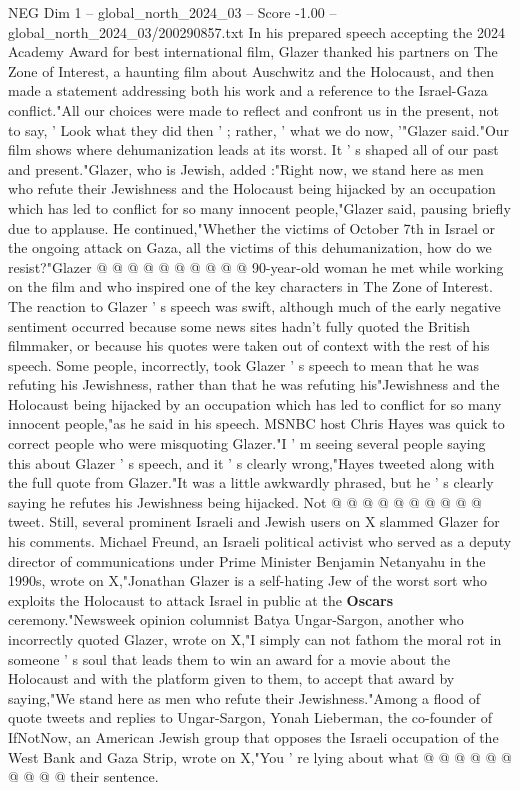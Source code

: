 \begin{textsample}{NEG Dim 1 – global\_north\_2024\_03 – Score -1.00 – global\_north\_2024\_03/200290857.txt}  \label{ex:f1_neg_073}
In his prepared speech accepting the 2024 Academy Award for best international film, Glazer thanked his partners on The Zone of Interest, a haunting film about Auschwitz and the Holocaust, and then made a statement addressing both his work and a reference to the Israel-Gaza conflict."All our choices were made to reflect and confront us in the present, not to say, ' Look what they did then ' ; rather, ' what we do now, '"Glazer said."Our film shows where dehumanization leads at its worst.
It ' s shaped all of our past and present."Glazer, who is Jewish, added :"Right now, we stand here as men who refute their Jewishness and the Holocaust being hijacked by an occupation which has led to conflict for so many innocent people,"Glazer said, pausing briefly due to applause.
He continued,"Whether the victims of October 7th in Israel or the ongoing attack on Gaza, all the victims of this dehumanization, how do we resist?"Glazer @ @ @ @ @ @ @ @ @ @ 90-year-old woman he met while working on the film and who inspired one of the key characters in The Zone of Interest.
The reaction to Glazer ' s speech was swift, although much of the early negative sentiment occurred because some news sites hadn't fully quoted the British filmmaker, or because his quotes were taken out of context with the rest of his speech.
Some people, incorrectly, took Glazer ' s speech to mean that he was refuting his Jewishness, rather than that he was refuting his"Jewishness and the Holocaust being hijacked by an occupation which has led to conflict for so many innocent people,"as he said in his speech.
MSNBC host Chris Hayes was quick to correct people who were misquoting Glazer."I ' m seeing several people saying this about Glazer ' s speech, and it ' s clearly wrong,"Hayes tweeted along with the full quote from Glazer."It was a little awkwardly phrased, but he ' s clearly saying he refutes his Jewishness being hijacked.
Not @ @ @ @ @ @ @ @ @ @ tweet.
Still, several prominent Israeli and Jewish users on X slammed Glazer for his comments.
Michael Freund, an Israeli political activist who served as a deputy director of communications under Prime Minister Benjamin Netanyahu in the 1990s, wrote on X,"Jonathan Glazer is a self-hating Jew of the worst sort who exploits the Holocaust to attack Israel in public at the \textbf{Oscars} ceremony."Newsweek opinion columnist Batya Ungar-Sargon, another who incorrectly quoted Glazer, wrote on X,"I simply can not fathom the moral rot in someone ' s soul that leads them to win an award for a movie about the Holocaust and with the platform given to them, to accept that award by saying,"We stand here as men who refute their Jewishness."Among a flood of quote tweets and replies to Ungar-Sargon, Yonah Lieberman, the co-founder of IfNotNow, an American Jewish group that opposes the Israeli occupation of the West Bank and Gaza Strip, wrote on X,"You ' re lying about what @ @ @ @ @ @ @ @ @ @ their sentence.

\end{textsample}
